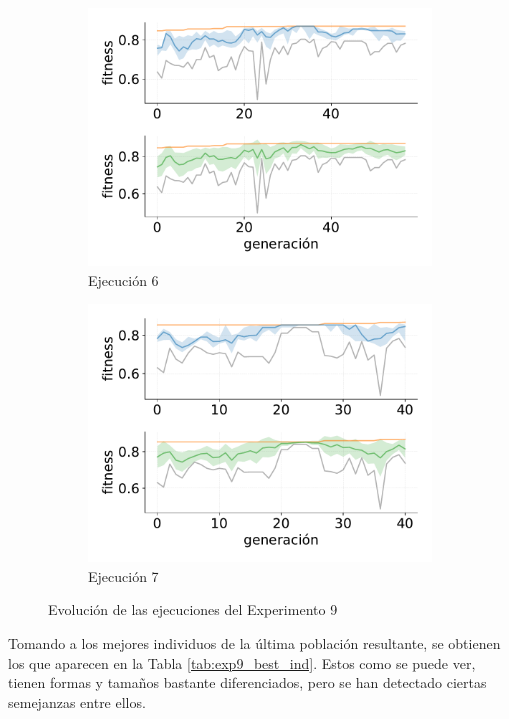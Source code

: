 \begin{figure}[p]
\begin{subfigure}{0.47\textwidth}
        \includegraphics[width=\textwidth]{figuras/experimentos/exp9/ind_6.pdf}
        \caption{Ejecución 6}
    \end{subfigure}
    \hfill
    \begin{subfigure}{0.47\textwidth}
        \centering
        \includegraphics[width=\textwidth]{figuras/experimentos/exp9/ind_7.pdf}
        \caption{Ejecución 7}
    \end{subfigure}
    \hfill
\caption{Evolución de las ejecuciones del Experimento 9}
\label{fig:exp9_evolucion}
\end{figure}

Tomando a los mejores individuos de la última población resultante, se obtienen los que aparecen en la Tabla \ref{tab:exp9_best_ind}. Estos como se puede ver, tienen formas y tamaños bastante diferenciados, pero se han detectado ciertas semejanzas entre ellos.

